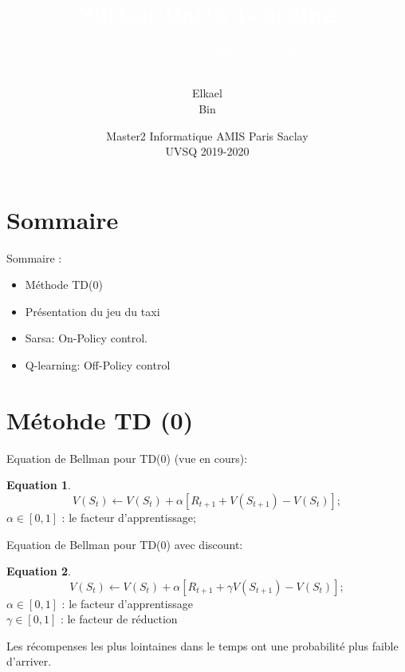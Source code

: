 \documentclass{beamer}	%
\title{\textcolor{white}{Sutton Barto Learning}}
\subtitle{\textcolor{white}{Chaptre 6: Temporal Difference Learning}}
\author{\\ Elkael \bsc{MAXIME}\\Bin \bsc{LIU} }
\date{Master2 Informatique AMIS Paris Saclay \\UVSQ 2019-2020}
\theoremstyle{plain}
\theoremstyle{definition}
\newtheorem{eq}{Equation}[section]
\theoremstyle{remark}
\numberwithin{equation}{section}
\begin{document}
\begin{frame}
\titlepage
\end{frame}



\section{Sommaire}

\begin{frame}

\begin{block}{Sommaire :}
\begin{itemize}
	\item Méthode TD(0)
	\item Présentation du jeu du taxi
	\item Sarsa: On-Policy control.
	\item Q-learning: Off-Policy control
\end{itemize}
\end{block}
	
\end{frame}

\section{Métohde TD (0) }

\begin{frame}
Equation de Bellman pour TD(0) (vue en cours):
\begin{eq}
\begin{equation}
    V(S_{t}) \leftarrow V(S_{t}) + \alpha \left [ R_{t+1} + V(S_{t+1}) - V(S_{t}) \right ] ;
\end{equation}
    $\alpha \in \left [ 0,1 \right ]$ : le facteur d'apprentissage;
\end{eq}
\end{frame}

\begin{frame}
Equation de Bellman pour TD(0) avec discount:
\begin{eq}

\begin{equation}
    V(S_{t}) \leftarrow V(S_{t}) + \alpha \left [ R_{t+1} + \gamma V(S_{t+1}) - V(S_{t}) \right ] ;
\end{equation}
    $\alpha \in \left [ 0,1 \right ]$ : le facteur d'apprentissage
    \\
    $\gamma \in \left [ 0,1 \right ]$ : le facteur de réduction
    \\
\end{eq}
Les récompenses les plus lointaines dans le temps ont une probabilité plus faible d'arriver.
\end{frame}
\end{document}
